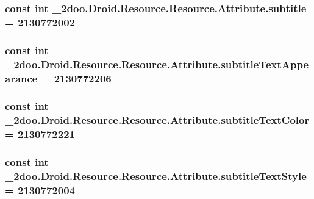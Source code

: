 \hypertarget{class__2doo_1_1_droid_1_1_resource_1_1_attribute_5c8c943059230be51e95eca23ed82aa8}{
\subsubsection[{subtitle}]{\setlength{\rightskip}{0pt plus 5cm}const int \_\-2doo.Droid.Resource.Resource.Attribute.subtitle = 2130772002}}
\label{class__2doo_1_1_droid_1_1_resource_1_1_attribute_5c8c943059230be51e95eca23ed82aa8}


\hypertarget{class__2doo_1_1_droid_1_1_resource_1_1_attribute_86a039cca505c088094fc1857c9f6243}{
\subsubsection[{subtitleTextAppearance}]{\setlength{\rightskip}{0pt plus 5cm}const int \_\-2doo.Droid.Resource.Resource.Attribute.subtitleTextAppearance = 2130772206}}
\label{class__2doo_1_1_droid_1_1_resource_1_1_attribute_86a039cca505c088094fc1857c9f6243}


\hypertarget{class__2doo_1_1_droid_1_1_resource_1_1_attribute_23eb7a248e16c6863fcc9bbee7021ad8}{
\subsubsection[{subtitleTextColor}]{\setlength{\rightskip}{0pt plus 5cm}const int \_\-2doo.Droid.Resource.Resource.Attribute.subtitleTextColor = 2130772221}}
\label{class__2doo_1_1_droid_1_1_resource_1_1_attribute_23eb7a248e16c6863fcc9bbee7021ad8}


\hypertarget{class__2doo_1_1_droid_1_1_resource_1_1_attribute_c164209a303cf19a66ff5cd0e8243200}{
\subsubsection[{subtitleTextStyle}]{\setlength{\rightskip}{0pt plus 5cm}const int \_\-2doo.Droid.Resource.Resource.Attribute.subtitleTextStyle = 2130772004}}
\label{class__2doo_1_1_droid_1_1_resource_1_1_attribute_c164209a303cf19a66ff5cd0e8243200}


